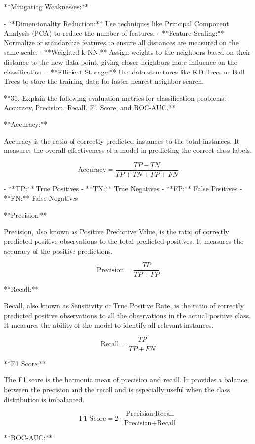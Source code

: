 **Mitigating Weaknesses:**

- **Dimensionality Reduction:** Use techniques like Principal Component Analysis (PCA) to reduce the number of features.
- **Feature Scaling:** Normalize or standardize features to ensure all distances are measured on the same scale.
- **Weighted k-NN:** Assign weights to the neighbors based on their distance to the new data point, giving closer neighbors more influence on the classification.
- **Efficient Storage:** Use data structures like KD-Trees or Ball Trees to store the training data for faster nearest neighbor search.

 **31. Explain the following evaluation metrics for classification problems: Accuracy, Precision, Recall, F1 Score, and ROC-AUC.**

**Accuracy:**

Accuracy is the ratio of correctly predicted instances to the total instances. It measures the overall effectiveness of a model in predicting the correct class labels.

\[ \text{Accuracy} = \frac{TP + TN}{TP + TN + FP + FN} \]

- **TP:** True Positives
- **TN:** True Negatives
- **FP:** False Positives
- **FN:** False Negatives

**Precision:**

Precision, also known as Positive Predictive Value, is the ratio of correctly predicted positive observations to the total predicted positives. It measures the accuracy of the positive predictions.

\[ \text{Precision} = \frac{TP}{TP + FP} \]

**Recall:**

Recall, also known as Sensitivity or True Positive Rate, is the ratio of correctly predicted positive observations to all the observations in the actual positive class. It measures the ability of the model to identify all relevant instances.

\[ \text{Recall} = \frac{TP}{TP + FN} \]

**F1 Score:**

The F1 score is the harmonic mean of precision and recall. It provides a balance between the precision and the recall and is especially useful when the class distribution is imbalanced.

\[ \text{F1 Score} = 2 \cdot \frac{\text{Precision} \cdot \text{Recall}}{\text{Precision} + \text{Recall}} \]

**ROC-AUC:**

